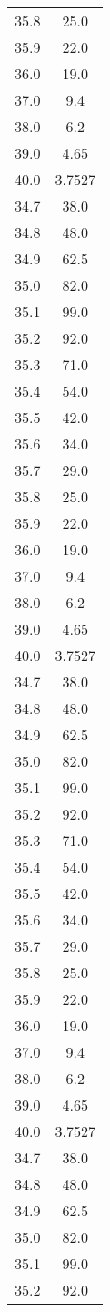 \begin{table}
\begin{tabular}{S[]S[]}
35.8 & 25.0\\
35.9 & 22.0\\
36.0 & 19.0\\
37.0 & 9.4\\
38.0 & 6.2\\
39.0 & 4.65\\
40.0 & 3.7527\\
34.7 & 38.0\\
34.8 & 48.0\\
34.9 & 62.5\\
35.0 & 82.0\\
35.1 & 99.0\\
35.2 & 92.0\\
35.3 & 71.0\\
35.4 & 54.0\\
35.5 & 42.0\\
35.6 & 34.0\\
35.7 & 29.0\\
35.8 & 25.0\\
35.9 & 22.0\\
36.0 & 19.0\\
37.0 & 9.4\\
38.0 & 6.2\\
39.0 & 4.65\\
40.0 & 3.7527\\
34.7 & 38.0\\
34.8 & 48.0\\
34.9 & 62.5\\
35.0 & 82.0\\
35.1 & 99.0\\
35.2 & 92.0\\
35.3 & 71.0\\
35.4 & 54.0\\
35.5 & 42.0\\
35.6 & 34.0\\
35.7 & 29.0\\
35.8 & 25.0\\
35.9 & 22.0\\
36.0 & 19.0\\
37.0 & 9.4\\
38.0 & 6.2\\
39.0 & 4.65\\
40.0 & 3.7527\\
34.7 & 38.0\\
34.8 & 48.0\\
34.9 & 62.5\\
35.0 & 82.0\\
35.1 & 99.0\\
35.2 & 92.0\\

\end{tabular}
\end{table}
